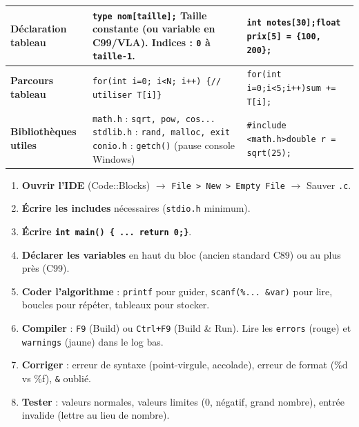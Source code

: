 \documentclass[11pt]{article}
\newcounter{popsec}
\newcounter{popsub}
\newcommand{\courssub}[1]{%
  \stepcounter{popsub}%
  \par\vspace{9pt}\noindent{\popxbold\fontsize{11.5}{13}\selectfont\color{popink}{\color{poporange}\thepopsec.\thepopsub}\hspace{6pt}#1}\par\nopagebreak\vspace{4pt}
}
\begin{document}
\begin{bilan}
\begin{center}
\begin{tabularx}{\linewidth}{|>{\bfseries}l|X|>{\ttfamily\small}l|}
\hline
Déclaration tableau &
\texttt{type nom[taille];}\newline
Taille constante (ou variable en C99/VLA). Indices : \texttt{0} à \texttt{taille-1}. &
\texttt{int notes[30];}\newline\texttt{float prix[5] = \{100, 200\};} \\
\hline
Parcours tableau &
\texttt{for(int i=0; i<N; i++) \{\newline\quad // utiliser T[i]\newline\}} &
\texttt{for(int i=0;i<5;i++)\newline\quad sum += T[i];} \\
\hline
Bibliothèques utiles &
\texttt{math.h} : \texttt{sqrt, pow, cos...}\newline
\texttt{stdlib.h} : \texttt{rand, malloc, exit}\newline
\texttt{conio.h} : \texttt{getch()} (pause console Windows) &
\texttt{\#include <math.h>}\newline\texttt{double r = sqrt(25);} \\
\hline
\end{tabularx}
\end{center}

\courssub{Méthodes express}

\begin{methode}
\begin{enumerate}
    \item \textbf{Ouvrir l'IDE} (Code::Blocks) $\rightarrow$ \texttt{File > New > Empty File} $\rightarrow$ Sauver \texttt{.c}.
    \item \textbf{Écrire les includes} nécessaires (\texttt{stdio.h} minimum).
    \item \textbf{Écrire \texttt{int main() \{\ ... return 0;\}}}.
    \item \textbf{Déclarer les variables} en haut du bloc (ancien standard C89) ou au plus près (C99).
    \item \textbf{Coder l'algorithme} : \texttt{printf} pour guider, \texttt{scanf(\%... \&var)} pour lire, boucles pour répéter, tableaux pour stocker.
    \item \textbf{Compiler} : \texttt{F9} (Build) ou \texttt{Ctrl+F9} (Build \& Run). Lire les \texttt{errors} (rouge) et \texttt{warnings} (jaune) dans le log bas.
    \item \textbf{Corriger} : erreur de syntaxe (point-virgule, accolade), erreur de format (\%d vs \%f), \texttt{\&} oublié.
    \item \textbf{Tester} : valeurs normales, valeurs limites (0, négatif, grand nombre), entrée invalide (lettre au lieu de nombre).
\end{enumerate}
\end{methode}


\end{bilan}
\end{document}
